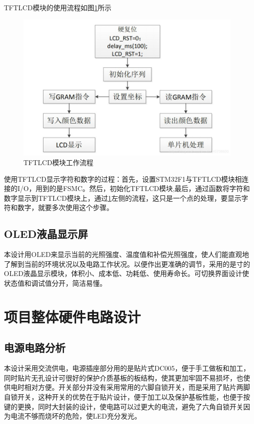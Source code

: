 \documentclass[UTF8]{ctexart}
\begin{document}
TFTLCD模块的使用流程如图\ref{f}所示
\begin{figure}[h]
	\centering
	\includegraphics[scale = 0.6]{7}
	\caption{TFTLCD模块工作流程}
	\label{f}
\end{figure}

使用TFTLCD显示字符和数字的过程：首先，设置STM32F1与TFTLCD模块相连接的I/O，用到的是FSMC。然后，初始化TFTLCD模块,最后，通过函数将字符和数字显示到TFTLCD模块上，通过\ref{f}左侧的流程，这只是一个点的处理，要显示字符和数字，就要多次使用这个步骤。

\subsection{OLED液晶显示屏}
本设计用OLED来显示当前的光照强度、温度值和补偿光照强度，使人们能直观地了解到当前的环境状况以及电路工作状况。以便作出更准确的调节，采用的是寸的OLED液晶显示模块，体积小、成本低、功耗低、使用寿命长。可切换界面设计使状态值和调试值分开，简洁易懂。

\section{项目整体硬件电路设计}
\subsection{电源电路分析}
本设计采用交流供电，电源插座部分用的是贴片式DC005，便于手工做板和加工，同时贴片无孔设计可很好的保护介质基板的板结构，使其更加牢固不易损坏，也使供电时相对方便。开关部分并没有采用常用的六脚自锁开关，而是采用了贴片两脚自锁开关，这种开关的优势在于贴片设计，便于加工以及保护基板性能，也便于按键的更换，同时大封装的设计，使电路可以过更大的电流，避免了六角自锁开关因为电流不够而烧坏的危险，使LED充分发光。
\end{document}
